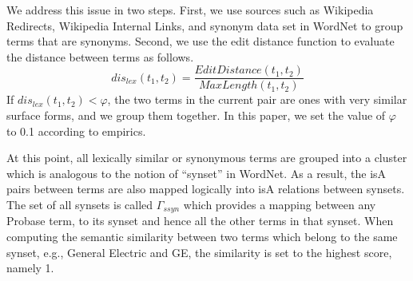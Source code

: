 We address this issue in two steps.  First, we use sources such as
Wikipedia Redirects, Wikipedia Internal Links, and synonym data set in
WordNet to group terms that are synonyms.  Second, we use the edit
distance function to evaluate the distance between terms as follows.
\begin{equation*}
dis_{lex}(t_{1}, t_{2}) = \frac{EditDistance(t_{1}, t_{2})}{MaxLength(t_{1}, t_{2})}
\label{eq:lexDist*}
\end{equation*}
If $dis_{lex}(t_{1}, t_{2}) < \varphi$, the two terms in the current pair are ones with very similar surface forms, and we group them together.
In this paper, we set the value of $\varphi$ to 0.1 according to empirics.

At this point, all lexically similar or synonymous terms are grouped into a
cluster which is analogous to the notion of ``synset'' in WordNet. As a result,
the isA pairs between terms are also mapped logically into isA relations
between synsets.
The set of all synsets is called $\Gamma_{ssyn}$ which provides a mapping between
any Probase term, to its synset and hence all the other terms in that synset.
When computing the semantic similarity between two terms which belong to
the same synset, e.g., General Electric and GE, the similarity is
set to the highest score, namely 1.
%
%

